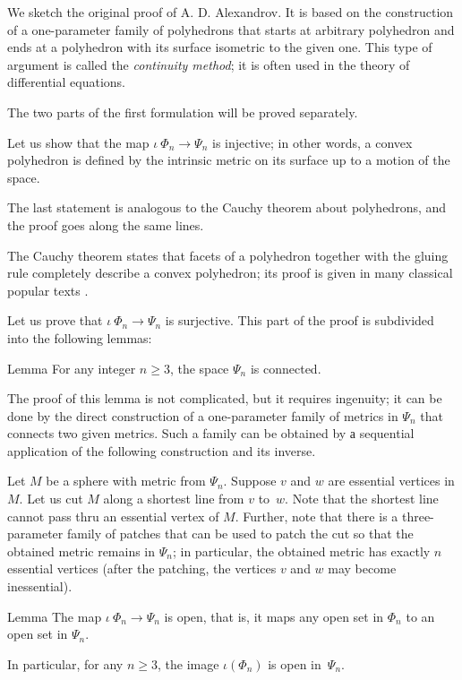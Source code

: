 We sketch the original proof of A. D. Alexandrov.
It is based on the  construction of a one-parameter family of polyhedrons that starts at arbitrary polyhedron
and ends at a polyhedron with its surface isometric to the given one.
This type of argument is called the \emph{continuity method}; it is often used in the theory of differential equations.

\medskip

The two parts of the first formulation will be proved separately.

 Let us show that the map $\iota\:\Phi_n\to\Psi_n$ is injective;
in other words, a convex polyhedron is defined by the intrinsic metric on its surface up to a motion of the space.

The last statement is analogous to the Cauchy theorem about polyhedrons,
and the proof goes along the same lines. 

The Cauchy theorem states that facets of a polyhedron together with the gluing rule completely describe a convex polyhedron;
its proof is given in many classical popular texts \cite{aigner-zigler,dolbilin,tabacnikov-fuks}.

\medskip

Let us prove that $\iota\:\Phi_n\to\Psi_n$ is surjective.
This part of the proof is subdivided into the following lemmas:

\begin{thm}{Lemma}
For any integer $n\ge 3$, the space $\Psi_n$ is connected.
\end{thm}

The proof of this lemma is not complicated, but it requires ingenuity;
it can be done by the direct construction of a one-parameter family of metrics in $\Psi_n$ that connects two given metrics.
Such a family can be obtained by а sequential application of the following construction and its inverse.

Let $M$ be a sphere with metric from $\Psi_n$.
Suppose $v$ and $w$ are essential vertices in $M$.
Let us cut $M$ along a shortest line from $v$ to~$w$.
Note that the shortest line cannot pass thru an essential vertex of $M$.
Further, note that there is a three-parameter family of patches that can be used to patch the cut so that the obtained metric remains in $\Psi_n$;
in particular, the obtained metric has exactly $n$ essential vertices (after the patching, the vertices $v$ and $w$ may become inessential).


\begin{thm}{Lemma}
The map $\iota\:\Phi_n\to\Psi_n$ is open, 
that is, it maps any open set in $\Phi_n$ to an open set in $\Psi_n$.

In particular, for any $n\ge 3$, the image $\iota(\Phi_n)$ is open in~$\Psi_n$.
\end{thm}

